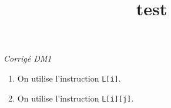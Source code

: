 \documentclass[a4paper,9pt]{report}
\title{test}
\begin{document}
\begin{center}
\textit{{ {\huge Corrigé DM1}}}
\end{center}


\bigskip

\begin{center}
\end{center}

\medskip

\begin{enumerate}
\item On utilise l'instruction {\tt L[i]}.
\item On utilise l'instruction {\tt L[i][j]}.
\end{enumerate}

\medskip

\begin{center}
\end{center}
\end{document}
